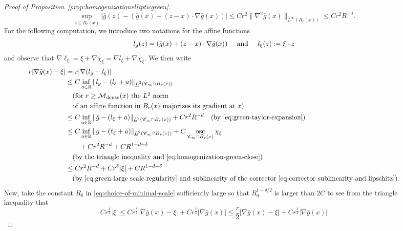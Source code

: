 \documentclass[12pt]{amsart}
\numberwithin{equation}{section}
\begin{document}
\begin{proof}[Proof of Proposition~\ref{prop:homogenizationellipticgreen}]
		\begin{equation} \label{eq:green-taylor-expansion}
			\sup_{z \in B_r(x)}  
			| \bar{g}(z) - ( \bar{g}(x) + (z-x) \cdot \nabla \bar{g}(x)) |
			\leq C r^2 \| \nabla^2 \bar{g}(x) \|_{L^{\infty}(B_r(x))}
			\leq C r^2 R^{-d}.
		\end{equation}
		For the following computation, we introduce two notations for the affine functions 
		\[
		l_g(z) =  ( \bar{g}(x) + (z-x) \cdot \nabla \bar{g}(x)) \hspace{5mm}\mbox{and} \hspace{5mm} l_\xi(z) := \xi \cdot z
		\]
		and observe that $\nabla \ell_\xi = \xi + \nabla \chi_\xi = \nabla l_\xi + \nabla \chi_\xi.$
		We then write
		\begin{align*}
			r | \nabla \bar{g}(x) - \xi | &= r | \nabla (l_g  - l_\xi) |  \\
			&\leq C \inf_{a \in \operatorname{\mathbb{R}}} \| l_g - (l_\xi   +  a   ) \|_{\underline{L}^2(\mathscr{C}_{\infty} \cap B_r(x))}\\
			& \quad \mbox{({for $r \geq \mathcal{M}_{\mathrm{dense}}(x)$ the $L^2$ norm }} \\
			&\quad \mbox{of an affine function in $B_{r}(x)$ majorizes its gradient at $x$}) \\ 
			&\leq C \inf_{a \in \operatorname{\mathbb{R}}} \| \bar{g} - (l_\xi +  a ) \|_{\underline{L}^2(\mathscr{C}_{\infty} \cap B_r(x))} + C r^2 R^{-d} \quad \mbox{(by \eqref{eq:green-taylor-expansion})} \\
			&\leq C \inf_{a \in \operatorname{\mathbb{R}}}\| g - (\ell_\xi +  a ) \|_{\underline{L}^2(\mathscr{C}_{\infty} \cap B_r(x))} + C \operatorname*{osc}_{\mathscr{C}_{\infty} \cap B_r(x)} \chi_{\xi} 
			\\& \qquad + Cr^2 R^{-d} + CR^{1 - d + \delta} \\
			&\quad \mbox{(by the triangle inequality and \eqref{eq:homogenization-green-close})} \\ 
			&\leq C r^2 R^{-d} + C r^{\delta} |\xi| + C R^{1 - d + \delta} \\
			&\quad \mbox{(by \eqref{eq:green-large scale-regularity} and sublinearity of the corrector \eqref{eq:corrector-sublinearity-and-lipschitz})}.
		\end{align*}
		Now, take the constant $R_0$ in \eqref{eq:choice-of-minimal-scale} sufficiently large so that $R_0^{1-\delta/2}$ is larger than $2C$ to see from the triangle inequality that 
		\begin{equation*}
			C r^{\frac{\delta}{2}} |\xi| \leq C r^{\frac{\delta}{2}} |\nabla \bar g(x) - \xi| + C r^{\frac{\delta}{2}} |\nabla \bar g(x)| \leq \frac{r}{2} |\nabla \bar g(x) - \xi| + C r^{\frac{\delta}{2}} |\nabla \bar g(x)|

\end{equation*}
\end{proof}
\end{document}
